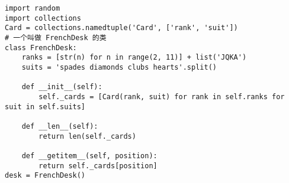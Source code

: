 \documentclass[UTF8]{ctexart}
\begin{document}
\begin{lstlisting}
import random
import collections
Card = collections.namedtuple('Card', ['rank', 'suit'])
# 一个叫做 FrenchDesk 的类
class FrenchDesk:
    ranks = [str(n) for n in range(2, 11)] + list('JQKA')
    suits = 'spades diamonds clubs hearts'.split()
    
    def __init__(self):
        self._cards = [Card(rank, suit) for rank in self.ranks for suit in self.suits]
        
    def __len__(self):
        return len(self._cards)
        
    def __getitem__(self, position):
        return self._cards[position]
desk = FrenchDesk()
\end{lstlisting}
\end{document}
